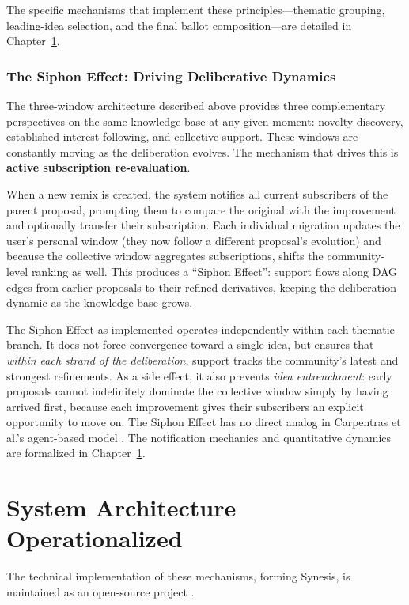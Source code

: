 \documentclass[a4paper, 12pt, twoside]{iviathesis}
\begin{document}
The specific mechanisms that implement these principles---thematic grouping, leading-idea selection, and the final ballot composition---are detailed in Chapter~\ref{ch:operationalized}.

\subsection{The Siphon Effect: Driving Deliberative Dynamics}
\label{sec:siphon-effect}

The three-window architecture described above provides three complementary perspectives on the same knowledge base at any given moment: novelty discovery, established interest following, and collective support. 
These windows are constantly moving as the deliberation evolves. The mechanism that drives this is \textbf{active subscription re-evaluation}.

When a new remix is created, the system notifies all current subscribers of the parent proposal, prompting them to compare the original with the improvement and optionally transfer their subscription. Each individual migration updates the user's personal window (they now follow a different proposal's evolution) and because the collective window aggregates subscriptions, shifts the community-level ranking as well. This produces a ``Siphon Effect'': support flows along DAG edges from earlier proposals to their refined derivatives, keeping the deliberation dynamic as the knowledge base grows.

The Siphon Effect as implemented operates independently within each thematic branch. It does not force convergence toward a single idea, but ensures that \textit{within each strand of the deliberation}, support tracks the community's latest and strongest refinements. As a side effect, it also prevents \textit{idea entrenchment}: early proposals cannot indefinitely dominate the collective window simply by having arrived first, because each improvement gives their subscribers an explicit opportunity to move on. The Siphon Effect has no direct analog in Carpentras et al.'s agent-based model \cite{carpentras_wisdom_2025}. The notification mechanics and quantitative dynamics are formalized in Chapter~\ref{ch:operationalized}.

\chapter{System Architecture Operationalized}
\label{ch:operationalized}

The technical implementation of these mechanisms, forming Synesis, is maintained as an open-source project \cite{drp_repo}.
\end{document}
